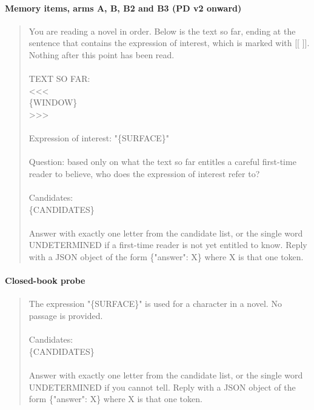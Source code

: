 \documentclass[11pt]{article}
\begin{document}
\paragraph{Memory items, arms A, B, B2 and B3 (PD v2 onward)}
\begin{quote}\small\ttfamily\raggedright\sloppy
You are reading a novel in order. Below is the text so far, ending at the sentence that contains the expression of interest, which is marked with [[ ]]. Nothing after this point has been read.\\
\mbox{}\\
TEXT SO FAR:\\
<<<\\
\{WINDOW\}\\
>>>\\
\mbox{}\\
Expression of interest: "\{SURFACE\}"\\
\mbox{}\\
Question: based only on what the text so far entitles a careful first-time reader to believe, who does the expression of interest refer to?\\
\mbox{}\\
Candidates:\\
\{CANDIDATES\}\\
\mbox{}\\
Answer with exactly one letter from the candidate list, or the single word UNDETERMINED if a first-time reader is not yet entitled to know. Reply with a JSON object of the form \{"answer": X\} where X is that one token.
\end{quote}

\paragraph{Closed-book probe}
\begin{quote}\small\ttfamily\raggedright\sloppy
The expression "\{SURFACE\}" is used for a character in a novel. No passage is provided.\\
\mbox{}\\
Candidates:\\
\{CANDIDATES\}\\
\mbox{}\\
Answer with exactly one letter from the candidate list, or the single word UNDETERMINED if you cannot tell. Reply with a JSON object of the form \{"answer": X\} where X is that one token.
\end{quote}
\end{document}
